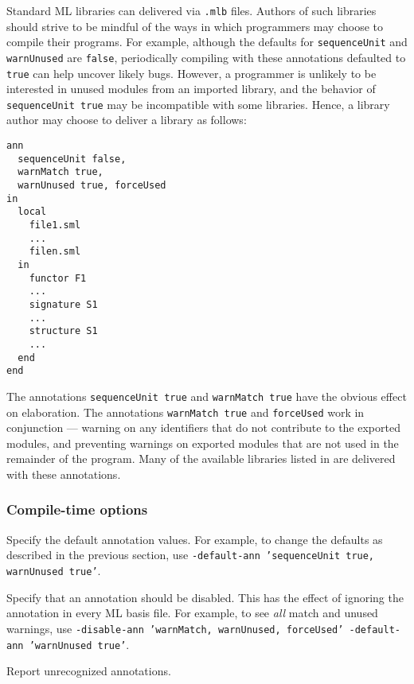 Standard ML libraries can delivered via {\tt .mlb} files.  Authors of
such libraries should strive to be mindful of the ways in which
programmers may choose to compile their programs.  For example,
although the defaults for {\tt sequenceUnit} and {\tt warnUnused} are
{\tt false}, periodically compiling with these annotations defaulted
to {\tt true} can help uncover likely bugs.  However, a programmer is
unlikely to be interested in unused modules from an imported library,
and the behavior of {\tt sequenceUnit true} may be incompatible with
some libraries.  Hence, a library author may choose to deliver a
library as follows:
\begin{verbatim}
ann 
  sequenceUnit false,
  warnMatch true,
  warnUnused true, forceUsed
in
  local
    file1.sml
    ...
    filen.sml
  in
    functor F1
    ...
    signature S1
    ...
    structure S1
    ...
  end
end
\end{verbatim}
The annotations {\tt sequenceUnit true} and {\tt warnMatch true} have
the obvious effect on elaboration.  The annotations {\tt warnMatch
true} and {\tt forceUsed} work in conjunction --- warning on any
identifiers that do not contribute to the exported modules, and
preventing warnings on exported modules that are not used in the
remainder of the program.  Many of the available libraries listed in
 are delivered with these annotations.

%
\subsubsection{Compile-time options}

\begin{description}

Specify the default annotation values.  For example, to change the
defaults as described in the previous section, use {\tt -default-ann
'sequenceUnit true, warnUnused true'}.

Specify that an annotation should be disabled.  This has the effect of
ignoring the annotation in every ML basis file.  For example, to see
\emph{all} match and unused warnings, use {\tt -disable-ann
'warnMatch, warnUnused, forceUsed' -default-ann 'warnUnused true'}.

Report unrecognized annotations.

\end{description}

